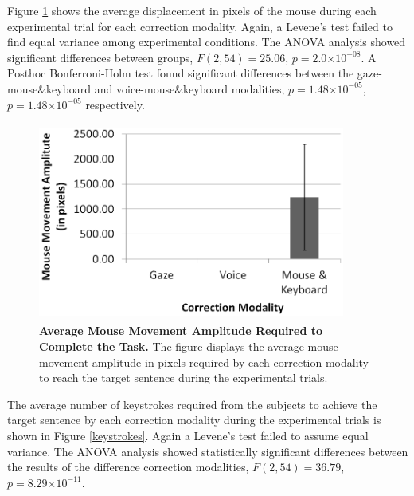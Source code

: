 \documentclass[]{article}
\providecommand{\e}[1]{\ensuremath{\times 10^{#1}}}
\begin{document}
Figure \ref{mouseDisplacement} shows the average displacement in pixels of the mouse during each experimental trial for
each correction modality. Again, a Levene's test failed to find equal variance among experimental conditions. The ANOVA
analysis showed significant differences between groups,  $F(2,54)=25.06$, $p=2.0\e{-08}$. A Posthoc Bonferroni-Holm test
found significant differences between the gaze-mouse\&keyboard and voice-mouse\&keyboard modalities,  $p=1.48\e{-05}$,
$p=1.48\e{-05}$ respectively.


\begin{figure}[!ht]
\begin{center}
\vspace{-3mm}
\includegraphics[width=0.9\textwidth,height=65mm]{figures/mouseDisplacement.png}
\end{center}
\caption{\textbf{Average Mouse Movement Amplitude Required to Complete the Task.} The figure displays the average mouse
movement amplitude in pixels required by each correction modality to reach the target sentence during the experimental trials.}
\label{mouseDisplacement}
\end{figure}


The average number of keystrokes required from the subjects to achieve the target sentence by each correction modality
during the experimental trials is shown in Figure \ref{keystrokes}. Again a Levene's test failed to assume equal
variance. The ANOVA analysis showed statistically significant differences between the results of the
difference correction modalities, $F(2,54)=36.79$, $p=8.29\e{-11}$. 
\end{document}
